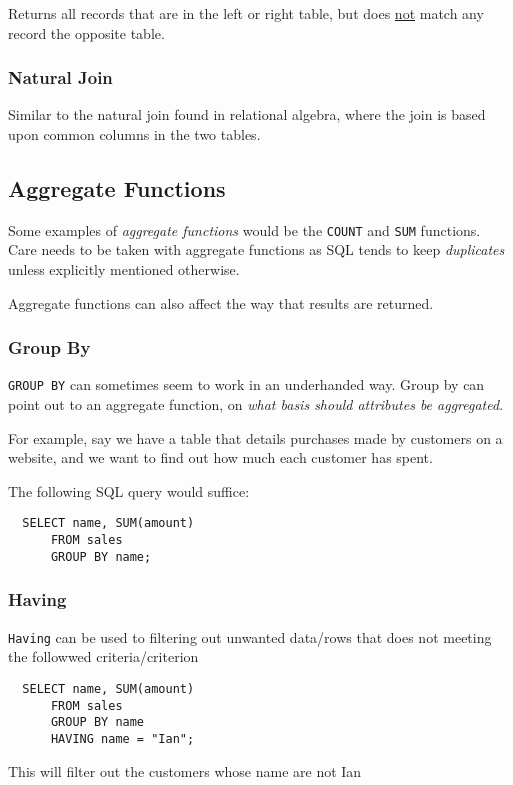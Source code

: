 \documentclass{article}
\begin{document}
Returns all records that are in the left or right table, but does \underline{not} match any record the opposite table.

\subsubsection*{Natural Join}

Similar to the natural join found in relational algebra, where the join is based upon common columns in the two tables.

\filbreak
\subsection{Aggregate Functions}

Some examples of \textit{aggregate functions} would be the \texttt{COUNT} and \texttt{SUM} functions. Care needs to be taken with aggregate functions as SQL tends to keep \textit{duplicates} unless explicitly mentioned otherwise.

Aggregate functions can also affect the way that results are returned.

\subsubsection*{Group By}

\texttt{GROUP BY} can sometimes seem to work in an underhanded way. Group by can point out to an aggregate function, on \textit{what basis should attributes be aggregated}.

For example, say we have a table that details purchases made by customers on a website, and we want to find out how much each customer has spent.

The following SQL query would suffice:

\begin{lstlisting}
  SELECT name, SUM(amount)
      FROM sales
      GROUP BY name;
\end{lstlisting}

\subsubsection*{Having}
\texttt{Having} can be used to filtering out unwanted data/rows that does not meeting the followwed criteria/criterion
\begin{lstlisting}
  SELECT name, SUM(amount)
      FROM sales
      GROUP BY name
      HAVING name = "Ian";
\end{lstlisting}
This will filter out the customers whose name are not Ian
\end{document}
